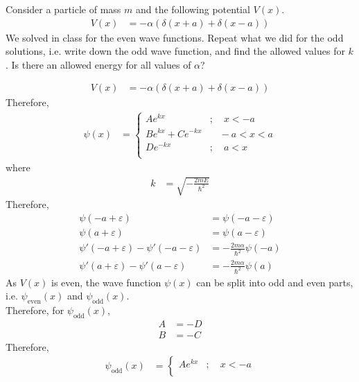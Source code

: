 \documentclass[fleqn, a4paper, 11pt, oneside]{amsart}
\theoremstyle{definition}
\theoremstyle{theorem}
\begin{document}
\begin{question}
	Consider a particle of mass $m$ and the following potential $V(x)$.
	\begin{align*}
		V(x) &= -\alpha \left( \delta(x + a) + \delta(x - a) \right)
	\end{align*}
	We solved in class for the even wave functions.
	Repeat what we did for the odd solutions, i.e. write down the odd wave function, and find the allowed values for $k$.
	Is there an allowed energy for all values of $\alpha$?
\end{question}

\begin{solution}
	\begin{align*}
		V(x) &= -\alpha \left( \delta(x + a) + \delta(x - a) \right)
	\end{align*}
	Therefore,
	\begin{align*}
		\psi(x) &=
			\begin{cases}
				A e^{k x} &;\quad x < -a\\
				B e^{k x} + C e^{-k x} &\quad -a < x < a\\
				D e^{-k x} &;\quad a < x\\
			\end{cases}
	\end{align*}
	where
	\begin{align*}
		k &= \sqrt{-\frac{2 m E}{\hbar^2}}
	\end{align*}
	Therefore,
	\begin{align*}
		\psi(-a + \varepsilon) &= \psi(-a - \varepsilon)\\
		\psi(a + \varepsilon) &= \psi(a - \varepsilon)\\
		\psi'(-a + \varepsilon) - \psi'(-a - \varepsilon) &= -\frac{2 m \alpha}{\hbar^2} \psi(-a)\\
		\psi'(a + \varepsilon) - \psi'(a - \varepsilon) &= -\frac{2 m \alpha}{\hbar^2} \psi(a)
	\end{align*}
	As $V(x)$ is even, the wave function $\psi(x)$ can be split into odd and even parts, i.e. $\psi_{\text{even}}(x)$ and $\psi_{\text{odd}}(x)$.\\
	Therefore, for $\psi_{\text{odd}}(x)$,
	\begin{align*}
		A &= -D\\
		B &= -C
	\end{align*}
	Therefore,
	\begin{align*}
		\psi_{\text{odd}}(x) &=
			\begin{cases}
				A e^{k x} &;\quad x < -a\\

\end{cases}
\end{align*}
\end{solution}
\end{document}
